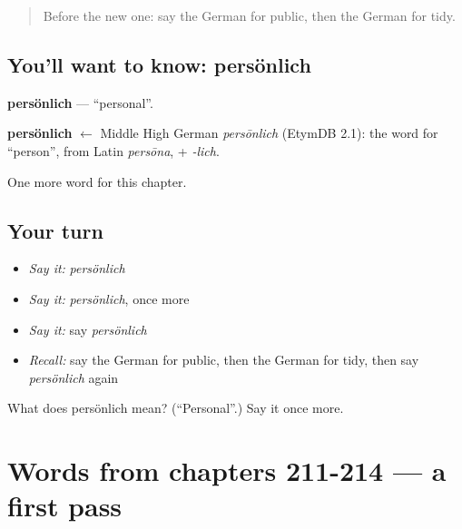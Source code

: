\label{lesson:GE-C219-persoenlich}



\begin{quote}
Before the new one: say the German for public, then the German for tidy.
\end{quote}

\subsection*{You'll want to know: persönlich}
\textbf{persönlich} — \textquotedblleft{}personal\textquotedblright{}.

\begin{cousinweb}
\textbf{persönlich} $\leftarrow$ Middle High German \emph{persōnlich} (EtymDB 2.1): the word for \textquotedblleft{}person\textquotedblright{}, from Latin \emph{persōna}, + \emph{-lich}.
\end{cousinweb}

\begin{grammarlens}[title={What you've built}]
One more word for this chapter.
\end{grammarlens}

\subsection*{Your turn}
\begin{itemize}
\raggedright
  \item \emph{Say it:} \emph{persönlich}
  \item \emph{Say it:} \emph{persönlich}, once more
  \item \emph{Say it:} say \emph{persönlich}
  \item \emph{Recall:} say the German for public, then the German for tidy, then say \emph{persönlich} again
\end{itemize}

\begin{tcolorbox}[breakable,colback=teal!4,colframe=teal!35!black,title={Before you move on}]
What does persönlich mean? (\textquotedblleft{}Personal\textquotedblright{}.) Say it once more.
\end{tcolorbox}
\section[(dialogue)]{Words from chapters 211-214 — a first pass}

\label{lesson:GE-R219-first-pass-words-from-chapters-211-214}



